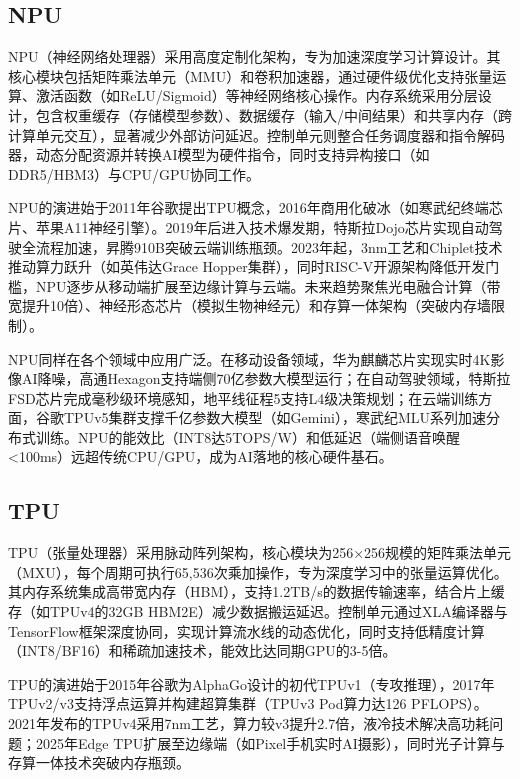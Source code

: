 \documentclass{article}
\begin{document}
\subsection{NPU}
NPU（神经网络处理器）采用高度定制化架构，专为加速深度学习计算设计。其核心模块包括矩阵乘法单元（MMU）和卷积加速器，通过硬件级优化支持张量运算、激活函数（如ReLU/Sigmoid）等神经网络核心操作。内存系统采用分层设计，包含权重缓存（存储模型参数）、数据缓存（输入/中间结果）和共享内存（跨计算单元交互），显著减少外部访问延迟。控制单元则整合任务调度器和指令解码器，动态分配资源并转换AI模型为硬件指令，同时支持异构接口（如DDR5/HBM3）与CPU/GPU协同工作。

NPU的演进始于2011年谷歌提出TPU概念，2016年商用化破冰（如寒武纪终端芯片、苹果A11神经引擎）\cite{kimm2021performance}。2019年后进入技术爆发期，特斯拉Dojo芯片实现自动驾驶全流程加速，昇腾910B突破云端训练瓶颈。2023年起，3nm工艺和Chiplet技术推动算力跃升（如英伟达Grace Hopper集群），同时RISC-V开源架构降低开发门槛，NPU逐步从移动端扩展至边缘计算与云端。未来趋势聚焦光电融合计算（带宽提升10倍）、神经形态芯片（模拟生物神经元）和存算一体架构（突破内存墙限制）\cite{huang2020memory}。

NPU同样在各个领域中应用广泛。在移动设备领域，华为麒麟芯片实现实时4K影像AI降噪，高通Hexagon支持端侧70亿参数大模型运行；在自动驾驶领域，特斯拉FSD芯片完成毫秒级环境感知，地平线征程5支持L4级决策规划；在云端训练方面，谷歌TPUv5集群支撑千亿参数大模型（如Gemini），寒武纪MLU系列加速分布式训练。NPU的能效比（INT8达5TOPS/W）和低延迟（端侧语音唤醒<100ms）远超传统CPU/GPU，成为AI落地的核心硬件基石\cite{kimm2021performance}。

\subsection{TPU}
TPU（张量处理器）采用脉动阵列架构，核心模块为256×256规模的矩阵乘法单元（MXU），每个周期可执行65,536次乘加操作，专为深度学习中的张量运算优化。其内存系统集成高带宽内存（HBM），支持1.2TB/s的数据传输速率，结合片上缓存（如TPUv4的32GB HBM2E）减少数据搬运延迟。控制单元通过XLA编译器与TensorFlow框架深度协同，实现计算流水线的动态优化，同时支持低精度计算（INT8/BF16）和稀疏加速技术，能效比达同期GPU的3-5倍。

TPU的演进始于2015年谷歌为AlphaGo设计的初代TPUv1（专攻推理）\cite{norrie2021design}，2017年TPUv2/v3支持浮点运算并构建超算集群（TPUv3 Pod算力达126 PFLOPS）。2021年发布的TPUv4采用7nm工艺，算力较v3提升2.7倍，液冷技术解决高功耗问题；2025年Edge TPU扩展至边缘端（如Pixel手机实时AI摄影），同时光子计算与存算一体技术突破内存瓶颈。
\end{document}
